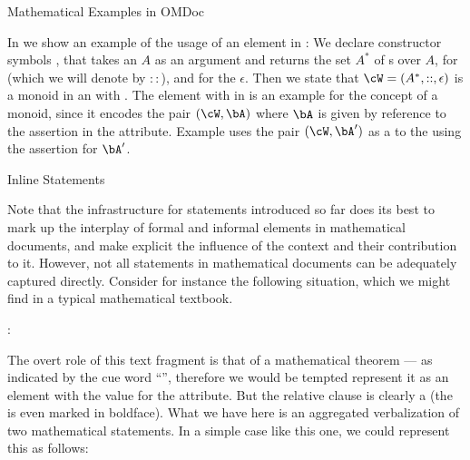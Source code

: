 \begin{omgroup}[short=Mathematical Statements,id=statements]
\begin{omgroup}[id=examples]{Mathematical Examples in OMDoc}
\begin{module}[id=examples]
In {} we show an example of the usage of an  element
in \omdoc: We declare constructor symbols {}, that takes an
{} $A$ as an argument and returns the set $A^*$ of
{s} over $A$, {} for {}
(which we will denote by $::$), and {} for the
{} $\epsilon$.  Then we state that $\cW=(A^*,::,\epsilon)$ is a
monoid in an  with {}.  The
 element with {} in {} is
an example for the concept of a monoid, since it encodes the pair $(\cW,\bA)$ where $\bA$
is given by reference to the assertion {} in the
 attribute.  Example {} uses the pair
$(\cW,\bA')$ as a {} to the {}
{} using the assertion {} for
$\bA'$.
\end{module}
\end{omgroup}

\begin{omgroup}[id=inline-statements]{Inline Statements}
\begin{module}[id=inline-statements]
 
Note that the infrastructure for statements introduced so far does its best to mark up the
interplay of formal and informal elements in mathematical documents, and make explicit the
influence of the context and their contribution to it. However, not all statements in
mathematical documents can be adequately captured directly.  Consider for instance the
following situation, which we might find in a typical mathematical textbook.
\begin{sblockquote}
  {}: {}
\end{sblockquote}
The overt role of this text fragment is that of a mathematical theorem --- as indicated by
the cue word ``{}'', therefore we would be tempted represent it as an
 element with the value  for the
 attribute. But the relative clause is clearly a
{} (the {} is even marked in boldface). What we
have here is an aggregated verbalization of two mathematical statements. In a simple case
like this one, we could represent this as follows:


\end{module}
\end{omgroup}
\end{omgroup}
